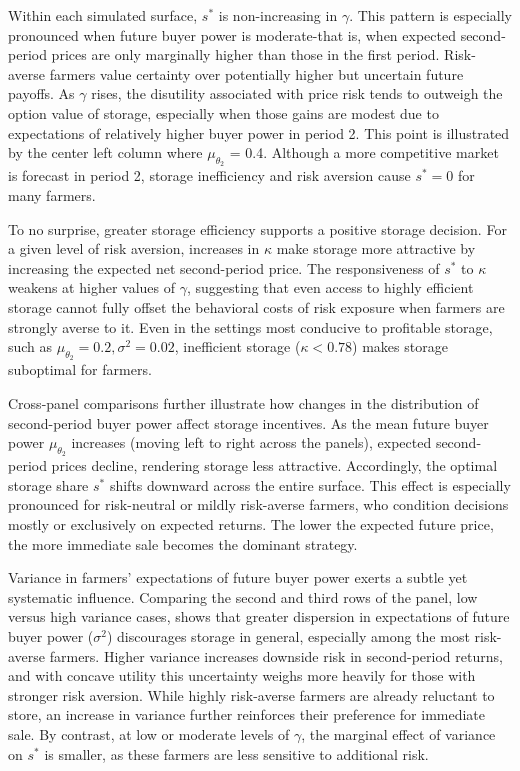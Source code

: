 Within each simulated surface, $s^*$ is non-increasing in $\gamma$. This pattern is especially pronounced when future buyer power is moderate-that is, when expected second-period prices are only marginally higher than those in the first period. Risk-averse farmers value certainty over potentially higher but uncertain future payoffs. As $\gamma$ rises, the disutility associated with price risk tends to outweigh the option value of storage, especially when those gains are modest due to expectations of relatively higher buyer power in period 2. This point is illustrated by the center left column where $\mu_{\theta_2}$ = 0.4. Although a more competitive market is forecast in period 2, storage inefficiency and risk aversion cause $s^*=0$ for many farmers.


To no surprise, greater storage efficiency supports a positive storage decision. For a given level of risk aversion, increases in $\kappa$ make storage more attractive by increasing the expected net second-period price. The responsiveness of $s^*$ to $\kappa$ weakens at higher values of $\gamma$, suggesting that even access to highly efficient storage cannot fully offset the behavioral costs of risk exposure when farmers are strongly averse to it. Even in the settings most conducive to profitable storage, such as $\mu_{\theta_2} = 0.2, \sigma^2= 0.02$, inefficient storage ($\kappa < 0.78$) makes storage suboptimal for farmers.


Cross-panel comparisons further illustrate how changes in the distribution of second-period buyer power affect storage incentives. As the mean future buyer power $\mu_{\theta_2}$ increases (moving left to right across the panels), expected second-period prices decline, rendering storage less attractive. Accordingly, the optimal storage share $s^*$ shifts downward across the entire surface. This effect is especially pronounced for risk-neutral or mildly risk-averse farmers, who condition decisions mostly or exclusively on expected returns. The lower the expected future price, the more immediate sale becomes the dominant strategy.


Variance in farmers' expectations of future buyer power exerts a subtle yet systematic influence. Comparing the second and third rows of the panel, low versus high variance cases, shows that greater dispersion in expectations of future buyer power ($\sigma^2$) discourages storage in general, especially among the most risk-averse farmers. Higher variance increases downside risk in second-period returns, and with concave utility this uncertainty weighs more heavily for those with stronger risk aversion. While highly risk-averse farmers are already reluctant to store, an increase in variance further reinforces their preference for immediate sale. By contrast, at low or moderate levels of $\gamma$, the marginal effect of variance on $s^*$ is smaller, as these farmers are less sensitive to additional risk.



